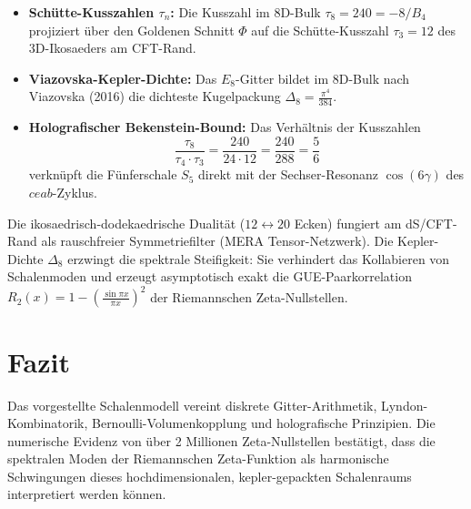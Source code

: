 \documentclass[11pt,a4paper]{article}
\begin{document}
	\begin{itemize}
		\item \textbf{Schütte-Kusszahlen $\tau_n$:} Die Kusszahl im $8\text{D}$-Bulk $\tau_8 = 240 = -8/B_4$ projiziert über den Goldenen Schnitt $\Phi$ auf die Schütte-Kusszahl $\tau_3 = 12$ des $3\text{D}$-Ikosaeders am CFT-Rand.
		\item \textbf{Viazovska-Kepler-Dichte:} Das $E_8$-Gitter bildet im $8\text{D}$-Bulk nach Viazovska (2016) die dichteste Kugelpackung $\Delta_8 = \frac{\pi^4}{384}$.
		\item \textbf{Holografischer Bekenstein-Bound:} Das Verhältnis der Kusszahlen
		$$\frac{\tau_8}{\tau_4 \cdot \tau_3} = \frac{240}{24 \cdot 12} = \frac{240}{288} = \frac{5}{6}$$
		verknüpft die Fünferschale $S_5$ direkt mit der Sechser-Resonanz $\cos(6\gamma)$ des $ceab$-Zyklus.
	\end{itemize}
	
	Die ikosaedrisch-dodekaedrische Dualität ($12 \leftrightarrow 20$ Ecken) fungiert am dS/CFT-Rand als rauschfreier Symmetriefilter (MERA Tensor-Netzwerk). Die Kepler-Dichte $\Delta_8$ erzwingt die spektrale Steifigkeit: Sie verhindert das Kollabieren von Schalenmoden und erzeugt asymptotisch exakt die GUE-Paarkorrelation $R_2(x) = 1 - \left(\frac{\sin \pi x}{\pi x}\right)^2$ der Riemannschen Zeta-Nullstellen.
	
	\section{Fazit}
	Das vorgestellte Schalenmodell vereint diskrete Gitter-Arithmetik, Lyndon-Kombinatorik, Bernoulli-Volumenkopplung und holografische Prinzipien. Die numerische Evidenz von über 2 Millionen Zeta-Nullstellen bestätigt, dass die spektralen Moden der Riemannschen Zeta-Funktion als harmonische Schwingungen dieses hochdimensionalen, kepler-gepackten Schalenraums interpretiert werden können.
	
\end{document}

